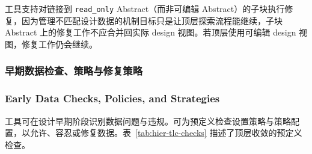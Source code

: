 \begin{noteBox}
工具支持对链接到 \texttt{read\_only} Abstract（而非可编辑 Abstract）的子块执行修复，因为管理不匹配设计数据的机制目标只是让顶层探索流程能继续，子块 Abstract 上的修复工作不应合并回实际 design 视图。若顶层使用可编辑 design 视图，修复工作仍会继续。
\end{noteBox}

\subsubsection{早期数据检查、策略与修复策略}
\subsubsection*{Early Data Checks, Policies, and Strategies}

工具可在设计早期阶段识别数据问题与违规。可为预定义检查设置策略与策略配置，以允许、容忍或修复数据。表~\ref{tab:hier-tlc-checks} 描述了顶层收敛的预定义检查。

